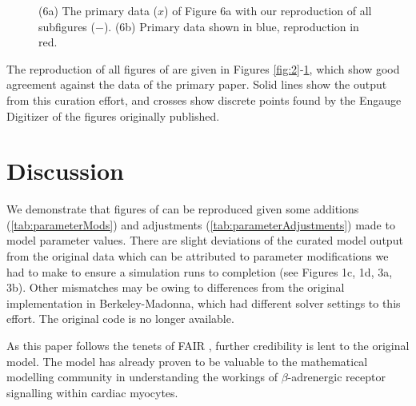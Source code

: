 \documentclass[fleqn,10pt]{physiome}
\begin{document}
\begin{figure}
\begin{subfigure}[b]{0.49\textwidth}
    \end{subfigure}
    \caption{(6a) The primary data ($x$) of Figure 6a with our reproduction of all subfigures ($-$). (6b) Primary data shown in blue, reproduction in red.}
    \label{fig:6}
\end{figure}

The reproduction of all figures of \cite{saucerman2003} are given in Figures \ref{fig:2}-\ref{fig:6}, which show good agreement against the data of the primary paper. Solid lines show the output from this curation effort, and crosses show discrete points found by the Engauge Digitizer of the figures originally published.

\section{Discussion}

We demonstrate that figures of \cite{saucerman2003} can be reproduced given some additions (\autoref{tab:parameterMods}) and adjustments (\autoref{tab:parameterAdjustments}) made to model parameter values. There are slight deviations of the curated model output from the original data which can be attributed to parameter modifications we had to make to ensure a simulation runs to completion (see Figures 1c, 1d, 3a, 3b). Other mismatches may be owing to differences from the original implementation in Berkeley-Madonna, which had different solver settings to this effort. The original code is no longer available. 

As this paper follows the tenets of FAIR \citep{wilkinson2016fair}, further credibility is lent to the original model. The model has already proven to be valuable to the mathematical modelling community in understanding the workings of $\beta$-adrenergic receptor signalling within cardiac myocytes.



\end{document}
